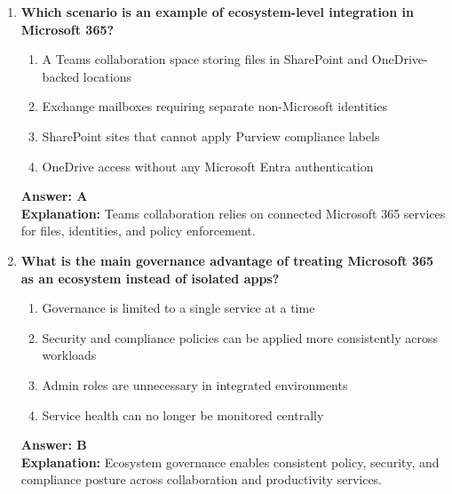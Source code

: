 \documentclass[10pt]{article}
\begin{document}
\begin{enumerate}[leftmargin=*]
\item \textbf{Which scenario is an example of ecosystem-level integration in Microsoft 365?}
\begin{enumerate}[label=\Alph*.]
  \item A Teams collaboration space storing files in SharePoint and OneDrive-backed locations
  \item Exchange mailboxes requiring separate non-Microsoft identities
  \item SharePoint sites that cannot apply Purview compliance labels
  \item OneDrive access without any Microsoft Entra authentication
\end{enumerate}
\textbf{Answer: A}\\
\textbf{Explanation:} Teams collaboration relies on connected Microsoft 365 services for files, identities, and policy enforcement.

\item \textbf{What is the main governance advantage of treating Microsoft 365 as an ecosystem instead of isolated apps?}
\begin{enumerate}[label=\Alph*.]
  \item Governance is limited to a single service at a time
  \item Security and compliance policies can be applied more consistently across workloads
  \item Admin roles are unnecessary in integrated environments
  \item Service health can no longer be monitored centrally
\end{enumerate}
\textbf{Answer: B}\\
\textbf{Explanation:} Ecosystem governance enables consistent policy, security, and compliance posture across collaboration and productivity services.

\end{enumerate}
\clearpage
\end{document}
